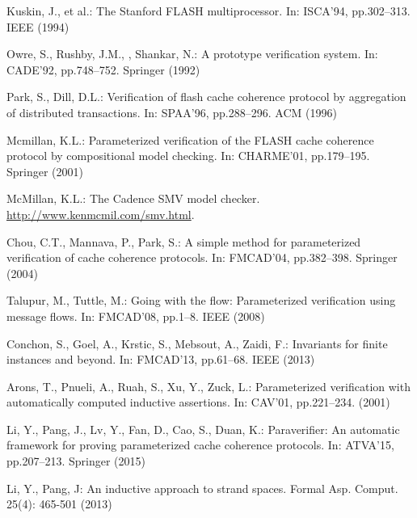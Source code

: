 \documentclass{llncs-new}
\begin{document}
\vspace{-3pt}
%
%

\begin{thebibliography}{50}

Kuskin, J., et al.:
\newblock The Stanford FLASH multiprocessor.
\newblock In: ISCA'94, pp.302--313. IEEE (1994)

Owre, S., Rushby, J.M., , Shankar, N.:
 {A} prototype verification system.
\newblock In: CADE'92,  pp.748--752. Springer (1992)

Park, S., Dill, D.L.:
\newblock Verification of flash cache coherence protocol by aggregation of
  distributed transactions.
\newblock In: SPAA'96, pp.288--296. ACM (1996)

Mcmillan, K.L.:
\newblock Parameterized verification of the FLASH cache coherence protocol by
  compositional model checking.
\newblock In: CHARME'01, pp.179--195. Springer (2001)

McMillan, K.L.:
\newblock The Cadence SMV model checker. \url{http://www.kenmcmil.com/smv.html}.

Chou, C.T., Mannava, P., Park, S.:
\newblock A simple method for parameterized verification of cache coherence
  protocols.
\newblock In: FMCAD'04, pp.382--398. Springer (2004)

Talupur, M., Tuttle, M.:
\newblock Going with the flow: Parameterized verification using message flows.
\newblock In: FMCAD'08, pp.1--8. IEEE (2008)

Conchon, S., Goel, A., Krstic, S., Mebsout, A., Zaidi, F.:
\newblock Invariants for finite instances and beyond.
\newblock In: FMCAD'13, pp.61--68. IEEE (2013)

Arons, T., Pnueli, A., Ruah, S., Xu, Y., Zuck, L.:
\newblock Parameterized verification with automatically computed inductive
  assertions.
\newblock In: CAV'01, pp.221--234. (2001)

Li, Y., Pang, J., Lv, Y., Fan, D., Cao, S., Duan, K.:
\newblock Paraverifier: An automatic framework for proving parameterized cache
  coherence protocols.
\newblock In: ATVA'15, pp.207--213. Springer (2015)

Li, Y., Pang, J:
\newblock An inductive approach to strand spaces. Formal Asp. Comput. 25(4): 465-501 (2013)


\end{thebibliography}
\end{document}
